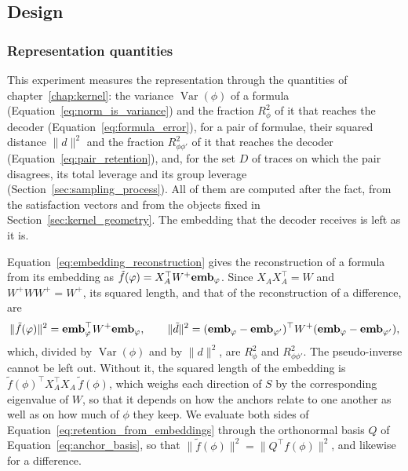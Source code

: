 \documentclass[titlepage,a4paper,11pt]{report}
\newenvironment{RSnewblock}{\par\color{blue!65!black}}{\par}
\begin{document}
    \subsection{Design}\label{sec:diag_design}
    \subsubsection{Representation quantities}
    \begin{RSnewblock}
    This experiment measures the representation through the quantities of chapter~\ref{chap:kernel}: the variance $\operatorname{Var}(\phi)$ of a formula (Equation~\eqref{eq:norm_is_variance}) and the fraction $R^2_\phi$ of it that reaches the decoder (Equation~\eqref{eq:formula_error}), for a pair of formulae, their squared distance $\lVert d\rVert^2$ and the fraction $R^2_{\phi\phi'}$ of it that reaches the decoder (Equation~\eqref{eq:pair_retention}), and, for the set $D$ of traces on which the pair disagrees, its total leverage and its group leverage (Section~\ref{sec:sampling_process}). All of them are computed after the fact, from the satisfaction vectors and from the objects fixed in Section~\ref{sec:kernel_geometry}. The embedding that the decoder receives is left as it is.

    Equation~\eqref{eq:embedding_reconstruction} gives the reconstruction of a formula from its embedding as $\tilde f(\varphi)=X_A^\top W^{+}\textbf{emb}_\varphi$. Since $X_AX_A^\top=W$ and $W^{+}WW^{+}=W^{+}$, its squared length, and that of the reconstruction of a difference, are
    \begin{equation}\label{eq:retention_from_embeddings}
        \lVert\tilde f(\varphi)\rVert^2=\textbf{emb}_\varphi^\top W^{+}\textbf{emb}_\varphi,
        \qquad
        \lVert\tilde d\rVert^2=(\textbf{emb}_\varphi-\textbf{emb}_{\varphi'})^\top W^{+}(\textbf{emb}_\varphi-\textbf{emb}_{\varphi'}),
    \end{equation}
    which, divided by $\operatorname{Var}(\phi)$ and by $\lVert d\rVert^2$, are $R^2_\phi$ and $R^2_{\phi\phi'}$. The pseudo-inverse cannot be left out. Without it, the squared length of the embedding is $\tilde f(\phi)^\top X_A^\top X_A\,\tilde f(\phi)$, which weighs each direction of $S$ by the corresponding eigenvalue of $W$, so that it depends on how the anchors relate to one another as well as on how much of $\phi$ they keep. We evaluate both sides of Equation~\eqref{eq:retention_from_embeddings} through the orthonormal basis $Q$ of Equation~\eqref{eq:anchor_basis}, so that $\lVert\tilde f(\phi)\rVert^2=\lVert Q^\top f(\phi)\rVert^2$, and likewise for a difference.


\end{RSnewblock}
\end{document}
